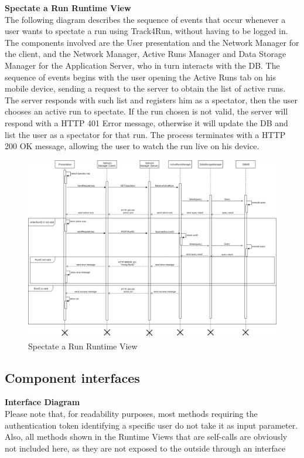 \documentclass[titlepage]{article}
\begin{document}
{\bf Spectate a Run Runtime View }\\ 
The following diagram describes the sequence of events that occur whenever a user wants to spectate a run using Track4Run, without having to be logged in.
The components involved are the User presentation and the Network Manager for the client, and the Network Manager, Active Runs Manager and Data Storage Manager for the Application Server, who in turn interacts with the DB.
The sequence of events begins with the user opening the Active Runs tab on his mobile device, sending a request to the server to obtain the list of active runs. The server responds with such list and registers him as a spectator, then the user chooses an active run to spectate. If the run chosen is not valid, the server will respond with a HTTP 401 Error message, otherwise it will update the DB and list the user as a spectator for that run. The process terminates with a HTTP 200 OK message, allowing the user to watch the run live on his device.

\begin{figure}[H]
	\center
  	\includegraphics[width=15cm]{Spectate.png}
  	\caption{Spectate a Run Runtime View}
 	\label{fig:SPEC}
\end{figure}

\pagebreak



\subsection{Component interfaces}

{\bf Interface Diagram }\\ 
Please note that, for readability purposes, most methods requiring the authentication token identifying a specific user do not take it as input parameter.
Also, all methods shown in the Runtime Views that are self-calls are obviously not included here, as they are not exposed to the outside through an interface
\end{document}
